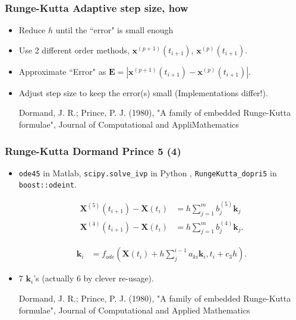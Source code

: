 \documentclass{beamer}
\begin{document}
\begin{frame}
\frametitle{Runge-Kutta Adaptive step size, how}
\begin{itemize}
\item <1-> Reduce $h$ until the ``error" is small enough

\item <2-> Use 2 different order methods, $\mathbf{x}^{(p+1)}(t_{i+1})$, $\mathbf{x}^{(p)}(t_{i+1})$.

\item <3-> Approximate ``Error" as  $\mathbf{E} = |\mathbf{x}^{(p+1)}(t_{i+1})-\mathbf{x}^{(p)}(t_{i+1})|$.

\item <4-> Adjust step size to keep the error(s) small (Implementations differ!).

{\color{gray} Dormand, J. R.; Prince, P. J. (1980), "A family of embedded Runge-Kutta formulae", Journal of Computational and AppliMathematics}
\begin{equation}
\end{equation}


\end{itemize}
\end{frame}


\begin{frame}
\frametitle{Runge-Kutta Dormand Prince 5 (4)}

\begin{itemize}
\item <1->\lstinline{ode45} in Matlab, \lstinline{scipy.solve_ivp} in Python , \lstinline{RungeKutta_dopri5} in \lstinline{boost::odeint}.

\begin{align*}
\mathbf{X}^{(5)}(t_{i+1})-\mathbf{X}(t_{i}) &=  h \sum_{j=1}^{m} b_j^{(5)} \mathbf{k}_j\\
\mathbf{X}^{(4)}(t_{i+1})-\mathbf{X}(t_{i}) &=  h \sum_{j=1}^{m} b_j^{(4)} \mathbf{k}_j.
\end{align*}

\begin{align*}
\mathbf{k}_i &= f_{ode}(\mathbf{X}(t_i)+h \sum_j^{i-1} a_{ki} \mathbf{k}_i,t_i+c_3 h).
\end{align*}

\item <2-> 7 $\mathbf{k}_i$'s (actually 6 by clever re-usage).

{\color{gray} Dormand, J. R.; Prince, P. J. (1980), "A family of embedded Runge-Kutta formulae", Journal of Computational and Applied Mathematics}
\end{itemize}
\end{frame}
\end{document}
